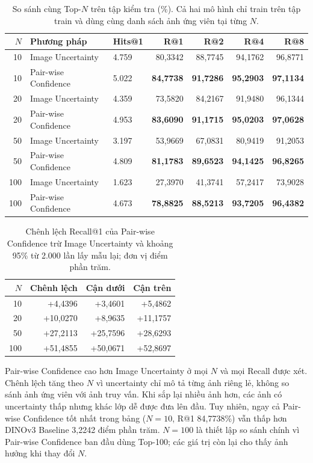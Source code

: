 \documentclass[11pt,a4paper]{article}
\begin{document}
\begin{table}[htbp]
\centering
\caption{So sánh cùng Top-$N$ trên tập kiểm tra (\%). Cả hai mô hình chỉ
train trên tập train và dùng cùng danh sách ảnh ứng viên tại từng $N$.}
\label{tab:matched-topn}
\begin{tabular}{@{}rllrrrr@{}}
\toprule
$N$ & Phương pháp & Hits@1 & R@1 & R@2 & R@4 & R@8\\
\midrule
10 & Image Uncertainty & 4.759 & 80,3342 & 88,7745 & 94,1762 & 96,8771\\
10 & Pair-wise Confidence & 5.022 & \textbf{84,7738} & \textbf{91,7286} & \textbf{95,2903} & \textbf{97,1134}\\
20 & Image Uncertainty & 4.359 & 73,5820 & 84,2167 & 91,9480 & 96,1344\\
20 & Pair-wise Confidence & 4.953 & \textbf{83,6090} & \textbf{91,1715} & \textbf{95,0203} & \textbf{97,0628}\\
50 & Image Uncertainty & 3.197 & 53,9669 & 67,0831 & 80,9419 & 91,2053\\
50 & Pair-wise Confidence & 4.809 & \textbf{81,1783} & \textbf{89,6523} & \textbf{94,1425} & \textbf{96,8265}\\
100 & Image Uncertainty & 1.623 & 27,3970 & 41,3741 & 57,2417 & 73,9028\\
100 & Pair-wise Confidence & 4.673 & \textbf{78,8825} & \textbf{88,5213} & \textbf{93,7205} & \textbf{96,4382}\\
\bottomrule
\end{tabular}
\end{table}

\begin{table}[htbp]
\centering
\caption{Chênh lệch Recall@1 của Pair-wise Confidence trừ Image Uncertainty
và khoảng 95\% từ 2.000 lần lấy mẫu lại; đơn vị điểm phần trăm.}
\begin{tabular}{@{}rrrr@{}}
\toprule
$N$ & Chênh lệch & Cận dưới & Cận trên\\
\midrule
10  & +4,4396  & +3,4601  & +5,4862\\
20  & +10,0270 & +8,9635  & +11,1757\\
50  & +27,2113 & +25,7596 & +28,6293\\
100 & +51,4855 & +50,0671 & +52,8697\\
\bottomrule
\end{tabular}
\end{table}

Pair-wise Confidence cao hơn Image Uncertainty ở mọi $N$ và mọi Recall được
xét. Chênh lệch tăng theo $N$ vì uncertainty chỉ mô tả từng ảnh riêng lẻ,
không so sánh ảnh ứng viên với ảnh truy vấn. Khi sắp lại nhiều ảnh hơn, các
ảnh có uncertainty thấp nhưng khác lớp dễ được đưa lên đầu. Tuy nhiên, ngay
cả Pair-wise Confidence tốt nhất trong bảng ($N=10$, R@1 84,7738\%) vẫn thấp
hơn DINOv3 Baseline 3,2242 điểm phần trăm. $N=100$ là thiết lập so sánh chính
vì Pair-wise Confidence ban đầu dùng Top-100; các giá trị còn lại cho thấy
ảnh hưởng khi thay đổi $N$.
\end{document}

